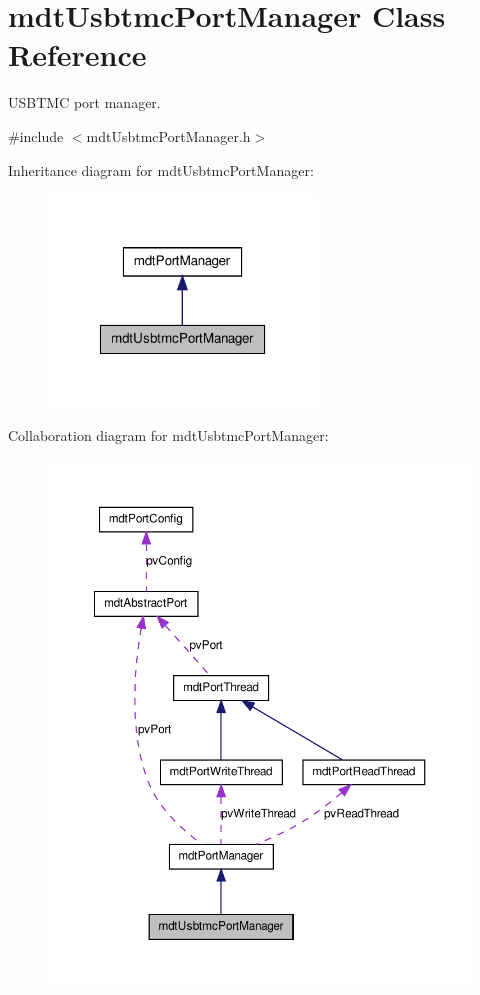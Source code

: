 \hypertarget{classmdt_usbtmc_port_manager}{
\section{mdtUsbtmcPortManager Class Reference}
\label{classmdt_usbtmc_port_manager}
}


USBTMC port manager.  




{\ttfamily \#include $<$mdtUsbtmcPortManager.h$>$}



Inheritance diagram for mdtUsbtmcPortManager:\nopagebreak
\begin{figure}[H]
\begin{center}
\leavevmode
\includegraphics[width=202pt]{classmdt_usbtmc_port_manager__inherit__graph}
\end{center}
\end{figure}


Collaboration diagram for mdtUsbtmcPortManager:\nopagebreak
\begin{figure}[H]
\begin{center}
\leavevmode
\includegraphics[width=362pt]{classmdt_usbtmc_port_manager__coll__graph}
\end{center}
\end{figure}
